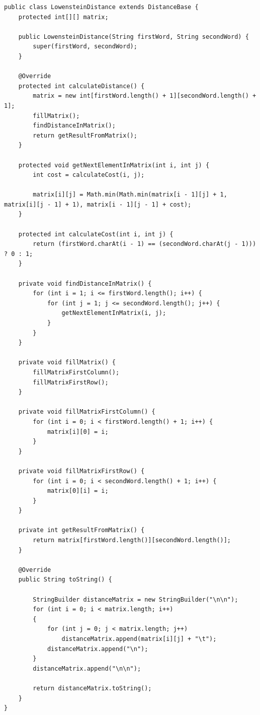\documentclass[12pt]{report}
\begin{document}
\begin{lstlisting}[label=some-code,caption=Класс нахождения расстояния Левенштейна матрично]
public class LowensteinDistance extends DistanceBase {
    protected int[][] matrix;

    public LowensteinDistance(String firstWord, String secondWord) {
        super(firstWord, secondWord);
    }

    @Override
    protected int calculateDistance() {
        matrix = new int[firstWord.length() + 1][secondWord.length() + 1];
        fillMatrix();
        findDistanceInMatrix();
        return getResultFromMatrix();
    }

    protected void getNextElementInMatrix(int i, int j) {
        int cost = calculateCost(i, j);

        matrix[i][j] = Math.min(Math.min(matrix[i - 1][j] + 1, matrix[i][j - 1] + 1), matrix[i - 1][j - 1] + cost);
    }

    protected int calculateCost(int i, int j) {
        return (firstWord.charAt(i - 1) == (secondWord.charAt(j - 1))) ? 0 : 1;
    }

    private void findDistanceInMatrix() {
        for (int i = 1; i <= firstWord.length(); i++) {
            for (int j = 1; j <= secondWord.length(); j++) {
                getNextElementInMatrix(i, j);
            }
        }
    }

    private void fillMatrix() {
        fillMatrixFirstColumn();
        fillMatrixFirstRow();
    }

    private void fillMatrixFirstColumn() {
        for (int i = 0; i < firstWord.length() + 1; i++) {
            matrix[i][0] = i;
        }
    }

    private void fillMatrixFirstRow() {
        for (int i = 0; i < secondWord.length() + 1; i++) {
            matrix[0][i] = i;
        }
    }

    private int getResultFromMatrix() {
        return matrix[firstWord.length()][secondWord.length()];
    }

    @Override
    public String toString() {

        StringBuilder distanceMatrix = new StringBuilder("\n\n");
        for (int i = 0; i < matrix.length; i++)
        {
            for (int j = 0; j < matrix.length; j++)
                distanceMatrix.append(matrix[i][j] + "\t");
            distanceMatrix.append("\n");
        }
        distanceMatrix.append("\n\n");

        return distanceMatrix.toString();
    }
}
\end{lstlisting}
\end{document}

